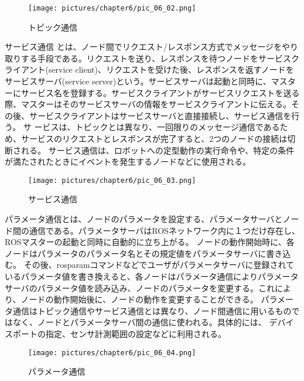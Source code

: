 \begin{figure}[h]
  \centering
  \texttt{[image: pictures/chapter6/pic\_06\_02.png]}
  \caption{トピック通信}
\end{figure}

\begin{definition*}
サービス通信   とは、ノード間でリクエスト/レスポンス方式でメッセージをやり取りする手段である。リクエストを送り、レスポンスを待つノードをサービスクライアント(service client)、リクエストを受けた後、レスポンスを返すノードをサービスサーバ(service server)という。サービスサーバは起動と同時に、マスターにサービス名を登録する。サービスクライアントがサービスリクエストを送る際、マスターはそのサービスサーバの情報をサービスクライアントに伝える。その後、サービスクライアントはサービスサーバと直接接続し、サービス通信を行う。
サ  ービスは、トピックとは異なり、一回限りのメッセージ通信であるため、サービスのリクエストとレスポンスが完了すると、2つのノードの接続は切断される。  サービス通信は、ロボットへの定型動作の実行命令や、特定の条件が満たされたときにイベントを発生するノードなどに使用される。
\end{definition*}

\begin{figure}[h]
  \centering
  \texttt{[image: pictures/chapter6/pic\_06\_03.png]}
  \caption{サービス通信}
\end{figure}

\begin{definition*}
パラメータ通信とは、ノードのパラメータを設定する、パラメータサーバとノード間の通信である。パラメータサーバはROSネットワーク内に１つだけ存在し、ROSマスターの起動と同時に自動的に立ち上がる。  ノードの動作開始時に、各ノードはパラメータのパラメータ名とその規定値をパラメータサーバに書き込む。  その後、rosparamコマンドなどでユーザがパラメータサーバに登録されているパラメータ値を書き換えると、各ノードはパラメータ通信によりパラメータサーバのパラメータ値を読み込み、ノードのパラメータを変更する。これにより、ノードの動作開始後に、ノードの動作を変更することができる。
パラメータ通信はトピック通信やサービス通信とは異なり、ノード間通信に用いるものではなく、ノードとパラメータサーバ間の通信に使われる。具体的には、  デバイスポートの指定、センサ計測範囲の設定などに利用される。
\end{definition*}

\begin{figure}[h]
  \centering
  \texttt{[image: pictures/chapter6/pic\_06\_04.png]}
  \caption{パラメータ通信}
\end{figure}

